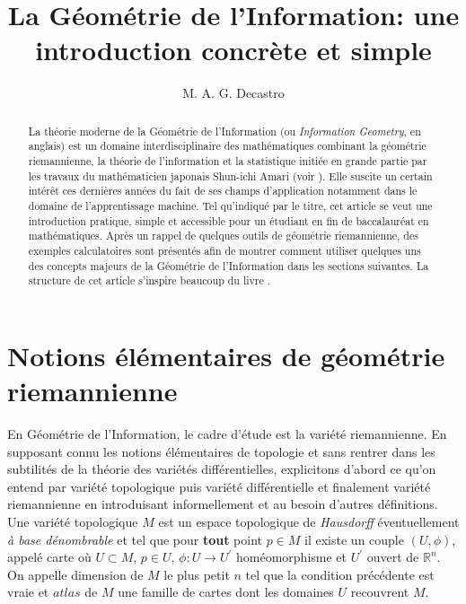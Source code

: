 \documentclass[11pt,french]{article}
\date{}
\title{\textbf{\color{blue}La Géométrie de l'Information: une introduction concrète et simple}}
\author{M. A. G. Decastro\\}
\begin{document}
	\maketitle

\renewcommand{\abstractname}{Résumé}
	
\begin{abstract}
La théorie moderne de la Géométrie de l'Information (ou \textit{Information Geometry}, en anglais) est un domaine interdisciplinaire des mathématiques combinant la géométrie riemannienne, la théorie de l'information et la statistique initiée en grande partie par les travaux du mathématicien japonais Shun-ichi Amari (voir \cite{amari1985differential}). Elle suscite un certain intérêt ces dernières années du fait de ses champs d'application notamment dans le domaine de l'apprentissage machine. Tel qu'indiqué par le titre, cet article se veut une introduction pratique, simple et accessible pour un étudiant en fin de baccalauréat en mathématiques. Après un rappel de quelques outils de géométrie riemannienne, des exemples calculatoires sont présentés afin de montrer comment utiliser quelques uns des concepts majeurs de la Géométrie de l'Information dans les sections suivantes. La structure de cet article s'inspire beaucoup du livre \cite{calin2014geometric}.
	 	
\end{abstract}
\nocite{*}
\section{Notions élémentaires de géométrie riemannienne}
En Géométrie de l'Information, le cadre d'étude est la variété riemannienne. En supposant connu les notions élémentaires de topologie et sans rentrer dans les subtilités de la théorie des variétés différentielles, explicitons d'abord ce qu'on entend par variété topologique puis variété différentielle et finalement variété riemannienne en introduisant informellement et au besoin d'autres définitions.\\

Une variété topologique $M$ est un espace topologique de \textit{Hausdorff} éventuellement \textit{à base dénombrable} et tel que pour \textbf{tout} point $p\in M$ il existe un couple $(U, \phi)$, appelé carte où $U\subset M$, $p \in U$, $\phi:U \longrightarrow U^{'}$ homéomorphisme et $U^{'}$ ouvert de $\mathbb{R}^{n}$.  
On appelle dimension de $M$ le plus petit $n$ tel que la condition précédente est vraie et $atlas$ de $M$ une famille de cartes dont les domaines $U$ recouvrent $M$.
\end{document}
